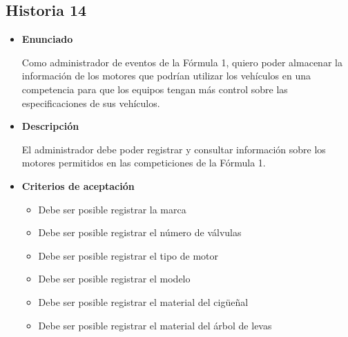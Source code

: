 \documentclass{article}
\begin{document}
	\subsection{Historia 14}
	\begin{itemize}
		
		\item \large{\textbf{Enunciado}}
		\begin{description}
Como administrador de eventos de la Fórmula 1, quiero poder almacenar la información de los motores que podrían utilizar los vehículos en una competencia para que los equipos tengan más control sobre las especificaciones de sus vehículos.

		\end{description}
		
		\item \large{\textbf{Descripción}}
		\begin{description}
El administrador debe poder registrar y consultar información sobre los motores permitidos en las competiciones de la Fórmula 1. 

		\end{description}
		
		\item \large{\textbf{Criterios de aceptación}}
		\begin{itemize}
			\item Debe ser posible registrar la marca
			\item Debe ser posible registrar el número de válvulas
			\item Debe ser posible registrar el tipo de motor
			\item Debe ser posible registrar el modelo
			\item Debe ser posible registrar el material del cigüeñal
			\item Debe ser posible registrar el material del árbol de levas
			
		\end{itemize}
		
	\end{itemize}
	
\end{document}
